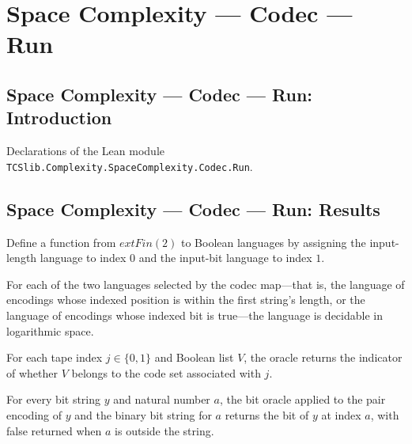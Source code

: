 \section{Space Complexity --- Codec --- Run}
\subsection*{Space Complexity --- Codec --- Run: Introduction}

Declarations of the Lean module \texttt{TCSlib.Complexity.SpaceComplexity.Codec.Run}.

\subsection*{Space Complexity --- Codec --- Run: Results}

\begin{definition}
\label{Complexity.Codec.codecAs}
\leanok
{}
Define a function from $	ext{Fin}(2)$ to Boolean languages by assigning the input-length
language to index $0$ and the input-bit language to index $1$.
\end{definition}

\begin{lemma}
\label{Complexity.Codec.codecAs_mem}
\leanok
{}
For each of the two languages selected by the codec map—that is, the language of
encodings whose indexed position is within the first string's length, or the language of
encodings whose indexed bit is true—the language is decidable in logarithmic space.
\end{lemma}

\begin{definition}
\label{Complexity.Codec.orc}
\leanok
{}
For each tape index $j\in\{0,1\}$ and Boolean list $V$, the oracle returns the indicator
of whether $V$ belongs to the code set associated with $j$.
\end{definition}

\begin{lemma}
\label{Complexity.Codec.orc_bit}
\leanok
{}
For every bit string $y$ and natural number $a$, the bit oracle applied to the pair
encoding of $y$ and the binary bit string for $a$ returns the bit of $y$ at index $a$,
with false returned when $a$ is outside the string.
\end{lemma}

